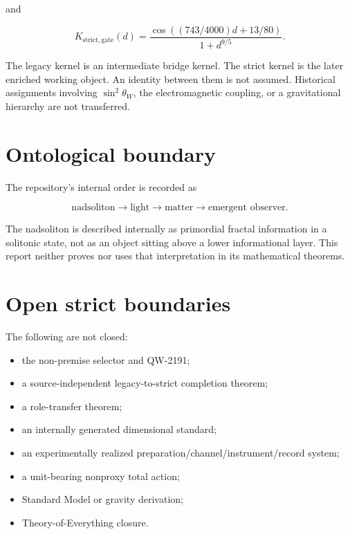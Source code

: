 \documentclass[11pt,a4paper,openany]{report}
\begin{document}
and

\[
K_{\mathrm{strict,gate}}(d)=
\frac{\cos((743/4000)d+13/80)}{1+d^{9/5}}.
\]

The legacy kernel is an intermediate bridge kernel. The strict kernel is the later enriched working object. An identity between them is not assumed. Historical assignments involving \(\sin^2\theta_W\), the electromagnetic coupling, or a gravitational hierarchy are not transferred.

\section{Ontological boundary}

The repository's internal order is recorded as

\[
\text{nadsoliton}
\longrightarrow \text{light}
\longrightarrow \text{matter}
\longrightarrow \text{emergent observer}.
\]

The nadsoliton is described internally as primordial fractal information in a solitonic state, not as an object sitting above a lower informational layer. This report neither proves nor uses that interpretation in its mathematical theorems.

\section{Open strict boundaries}

The following are not closed:

\begin{itemize}
\item 
the non-premise selector and QW-2191;

\item 
a source-independent legacy-to-strict completion theorem;

\item 
a role-transfer theorem;

\item 
an internally generated dimensional standard;

\item 
an experimentally realized preparation/\allowbreak{}channel/\allowbreak{}instrument/\allowbreak{}record system;

\item 
a unit-bearing nonproxy total action;

\item 
Standard Model or gravity derivation;

\item 
Theory-of-Everything closure.

\end{itemize}
\end{document}
